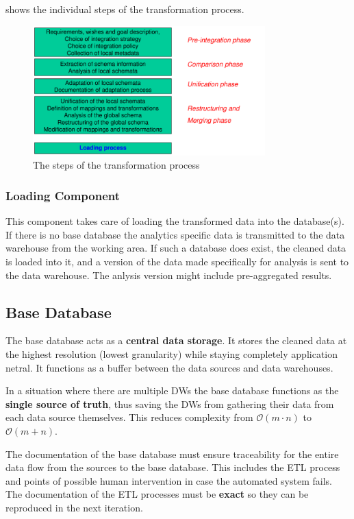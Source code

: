 \documentclass{article}
\begin{document}
 shows the individual steps of the transformation process.

\begin{figure}[hp]
    \centering
    \includegraphics[width=0.8\textwidth]{transformation.png}
    \caption{The steps of the transformation process}
    \label{fig:transformation}
\end{figure}

\subsubsection{Loading Component}
This component takes care of loading the transformed data into the database(s).
If there is no base database the analytics specific data is transmitted to the data warehouse from the working area.
If such a database does exist, the cleaned data is loaded into it, and a version of the data made specifically for analysis is sent to the data warehouse.
The anlysis version might include pre-aggregated results.

\subsection{Base Database}
The base database acts as a \textbf{central data storage}.
It stores the cleaned data at the highest resolution (lowest granularity) while staying completely application netral.
It functions as a buffer between the data sources and data warehouses.

In a situation where there are multiple DWs the base database functions as the \textbf{single source of truth}, thus saving the DWs from gathering their data from each data source themselves.
This reduces complexity from $\mathcal O (m \cdot n)$ to $\mathcal O (m + n)$.

The documentation of the base database must ensure traceability for the entire data flow from the sources to the base database.
This includes the ETL process and points of possible human intervention in case the automated system fails.
The documentation of the ETL processes must be \textbf{exact} so they can be reproduced in the next iteration.
\end{document}
